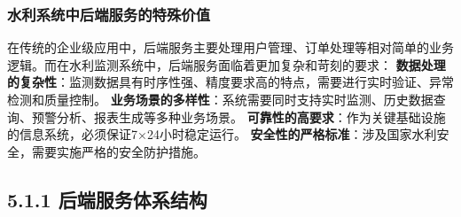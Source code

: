 \subsubsection{水利系统中后端服务的特殊价值}\label{ux6c34ux5229ux7cfbux7edfux4e2dux540eux7aefux670dux52a1ux7684ux7279ux6b8aux4ef7ux503c}
在传统的企业级应用中，后端服务主要处理用户管理、订单处理等相对简单的业务逻辑。而在水利监测系统中，后端服务面临着更加复杂和苛刻的要求：
\textbf{数据处理的复杂性}：监测数据具有时序性强、精度要求高的特点，需要进行实时验证、异常检测和质量控制。 \textbf{业务场景的多样性}：系统需要同时支持实时监测、历史数据查询、预警分析、报表生成等多种业务场景。
\textbf{可靠性的高要求}：作为关键基础设施的信息系统，必须保证7×24小时稳定运行。 \textbf{安全性的严格标准}：涉及国家水利安全，需要实施严格的安全防护措施。 \subsection{5.1.1
后端服务体系结构}\label{ux540eux7aefux670dux52a1ux4f53ux7cfbux7ed3ux6784}
